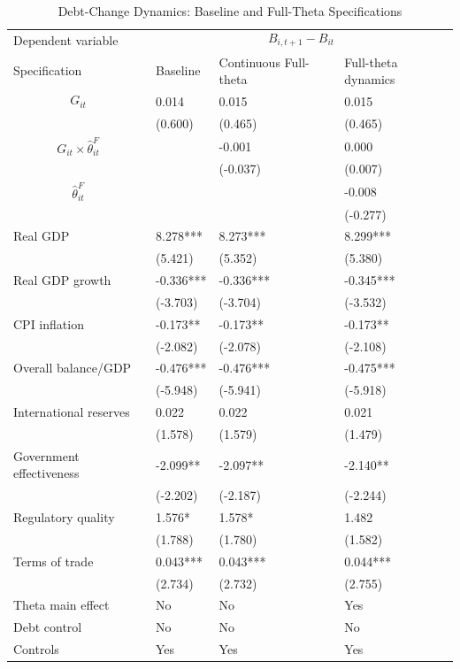 \begin{table}[H]\centering
\begin{threeparttable}
\caption{Debt-Change Dynamics: Baseline and Full-Theta Specifications}
\label{tab:debt_change_combined_fulltheta}
\scriptsize
\begin{tabularx}{\textwidth}{lYYY}
\toprule
Dependent variable &  \\
\cmidrule(lr){2-4}
Specification & Baseline & Continuous Full-theta & Full-theta dynamics \\
\midrule
$$G_{it}$$ & 0.014 & 0.015 & 0.015 \\
 & (0.600) & (0.465) & (0.465) \\
$$G_{it}\times\widehat{\theta}^{F}_{it}$$ &  & -0.001 & 0.000 \\
 &  & (-0.037) & (0.007) \\
$$\widehat{\theta}^{F}_{it}$$ &  &  & -0.008 \\
 &  &  & (-0.277) \\
Real GDP & 8.278*** & 8.273*** & 8.299*** \\
 & (5.421) & (5.352) & (5.380) \\
Real GDP growth & -0.336*** & -0.336*** & -0.345*** \\
 & (-3.703) & (-3.704) & (-3.532) \\
CPI inflation & -0.173** & -0.173** & -0.173** \\
 & (-2.082) & (-2.078) & (-2.108) \\
Overall balance/GDP & -0.476*** & -0.476*** & -0.475*** \\
 & (-5.948) & (-5.941) & (-5.918) \\
International reserves & 0.022 & 0.022 & 0.021 \\
 & (1.578) & (1.579) & (1.479) \\
Government effectiveness & -2.099** & -2.097** & -2.140** \\
 & (-2.202) & (-2.187) & (-2.244) \\
Regulatory quality & 1.576* & 1.578* & 1.482 \\
 & (1.788) & (1.780) & (1.582) \\
Terms of trade & 0.043*** & 0.043*** & 0.044*** \\
 & (2.734) & (2.732) & (2.755) \\
\midrule
Theta main effect & No & No & Yes \\
Debt control & No & No & No \\
Controls & Yes & Yes & Yes \\

\end{tabularx}
\end{threeparttable}
\end{table}

